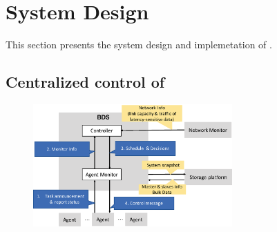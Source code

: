 \section{System Design}
\label{sec:system}

This section presents the system design and implemetation of 
\name.

\subsection{Centralized control of \name}
\label{subsec:system:centralized}

\begin{figure}[t]
  \centering
  \includegraphics[width=3in]{images/implementation_v3.eps}
  \label{fig:implementation}
\vspace{-0.4cm}
\end{figure}

